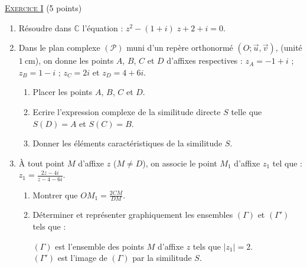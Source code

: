 \providecommand{\Courbe}{(\mathscr{C})}
\providecommand{\D}{(\mathscr{D})}
\providecommand{\Plan}{(\mathscr{P})}
\providecommand{\Ouv}{(O ; \vec{u} , \vec{v})}
\providecommand{\cm}{~\mathrm{cm}}
\providecommand{\dx}{~\mathrm{d}x}
\providecommand{\Arg}[1]{\mathrm{Arg}\left( #1 \right)}
\providecommand{\Angl}[2]{\left( \overrightarrow{#1} ; \overrightarrow{#2} \right)}
\noindent \underline{\textsc{Exercice I}} (5 points)
      \begin{enumerate}
            \item R\'esoudre dans $\mathbb{C}$ l'\'equation : $z^2 - (1+i)\; z + 2 + i = 0$.
            \item Dans le plan complexe $\Plan$ muni d'un rep\`ere orthonorm\'e $\Ouv$, (unit\'e $1 \cm$), 
                  on donne les points $A$, $B$, $C$ et $D$ d'affixes respectives : 
                  $z_A = -1 + i$ ; $z_B = 1 - i$ ; $z_C = 2i$ et $z_D = 4 + 6i$.
                  \begin{enumerate}
                        \item Placer les points $A$, $B$, $C$ et $D$.
                        \item Ecrire l'expression complexe de la similitude directe $S$ telle que $S(D) = A$ et $S(C) = B$.
                        \item Donner les \'el\'ements caract\'eristiques de la similitude $S$.
                  \end{enumerate}
            \item \`A tout point $M$ d'affixe $z$ ($M \neq D$), on associe le point $M_1$ d'affixe $z_1$ tel que :
                  $z_1 = \frac{2 z - 4 i}{z - 4 - 6i}$.
                  \begin{enumerate}
                        \item Montrer que $OM_1 = \frac{2 CM}{DM}$.
                        \item D\'eterminer et repr\'esenter graphiquement les ensembles $(\Gamma)$ et $(\Gamma')$ tels que :
                              \begin{mitanisa}
                                    $(\Gamma)$ est l'ensemble des points $M$ d'affixe $z$ tels que $|z_1|=2$. \\
                                    $(\Gamma')$ est l'image de $(\Gamma)$ par la similitude $S$.
                              \end{mitanisa}
                  \end{enumerate}
      \end{enumerate}
